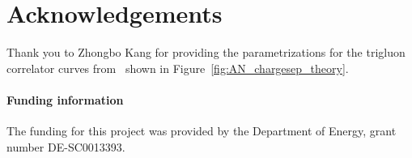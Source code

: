\documentclass[submission, Proceedings]{SciPost}
\begin{document}
\section*{Acknowledgements}
Thank you to Zhongbo Kang for providing the parametrizations for the trigluon correlator curves from~\cite{trigluon_twists} shown in Figure~\ref{fig:AN_chargesep_theory}.
\paragraph{Funding information}
The funding for this project was provided by the Department of Energy, grant number DE-SC0013393.


\end{document}
